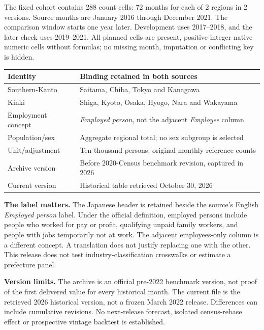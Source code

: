 \documentclass[10pt,letterpaper]{article}
\begin{document}
The fixed cohort contains 288 count cells: 72 months for each of 2 regions in 2 versions. Source months are January 2016 through December 2021. The comparison window starts one year later. Development uses 2017--2018, and the later check uses 2019--2021. All planned cells are present, positive integer native numeric cells without formulas; no missing month, imputation or conflicting key is hidden.

\begin{center}\small
\begin{tabular}{@{}p{.23\linewidth}p{.70\linewidth}@{}}\toprule
Identity & Binding retained in both sources\\\midrule
Southern-Kanto & Saitama, Chiba, Tokyo and Kanagawa\\
Kinki & Shiga, Kyoto, Osaka, Hyogo, Nara and Wakayama\\
Employment concept & \textit{Employed person}, not the adjacent \textit{Employee} column\\
Population/sex & Aggregate regional total; no sex subgroup is selected\\
Unit/adjustment & Ten thousand persons; original monthly reference counts\\
Archive version & Before 2020-Census benchmark revision, captured in 2026\\
Current version & Historical table retrieved October 30, 2026\\\bottomrule
\end{tabular}\end{center}

\textbf{The label matters.} The Japanese header is retained beside the source's English \textit{Employed person} label. Under the official definition, employed persons include people who worked for pay or profit, qualifying unpaid family workers, and people with jobs temporarily not at work. The adjacent employees-only column is a different concept. A translation does not justify replacing one with the other. This release does not test industry-classification crosswalks or estimate a prefecture panel.

\textbf{Version limits.} The archive is an official pre-2022 benchmark version, not proof of the first delivered value for every historical month. The current file is the retrieved 2026 historical version, not a frozen March 2022 release. Differences can include cumulative revisions. No next-release forecast, isolated census-rebase effect or prospective vintage backtest is established.
\end{document}
